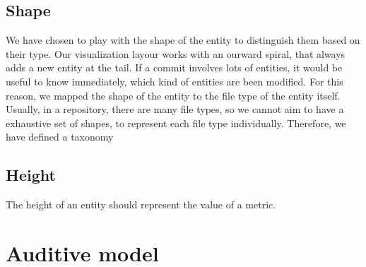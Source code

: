 \subsection*{Shape}
We have chosen to play with the shape of the entity to distinguish them based on their type. 
Our visualization layour works with an ourward spiral, that always adds a new entity at the tail. 
If a commit involves lots of entities, it would be useful to know immediately, which kind of entities are been modified. 
For this reason, we mapped the shape of the entity to the file type of the entity itself.
Usually, in a repository, there are many file types, so we cannot aim to have a exhaustive set of shapes, to represent each file type individually. 
Therefore, we have defined a taxonomy

\subsection*{Height}
The height of an entity should represent the value of a metric.


\section{Auditive model}
